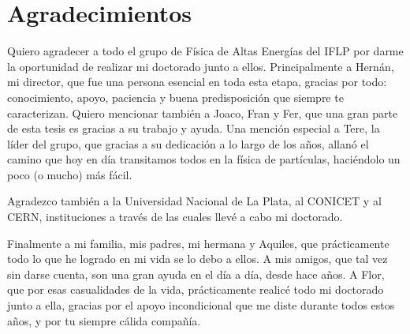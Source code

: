 \chapter*{Agradecimientos}

Quiero agradecer a todo el grupo de Física de Altas Energías del IFLP por darme la oportunidad de realizar mi doctorado junto a ellos. Principalmente a Hernán, mi director, que fue una persona esencial en toda esta etapa, gracias por todo: conocimiento, apoyo, paciencia y buena predisposición que siempre te caracterizan. Quiero mencionar también a Joaco, Fran y Fer, que una gran parte de esta tesis es gracias a su trabajo y ayuda. Una mención especial a Tere, la líder del grupo, que gracias a su dedicación a lo largo de los años, allanó el camino que hoy en día transitamos todos en la física de partículas, haciéndolo un poco (o mucho) más fácil. 

Agradezco también a la Universidad Nacional de La Plata, al CONICET y al CERN, instituciones a través de las cuales llevé a cabo mi doctorado.

Finalmente a mi familia, mis padres, mi hermana y Aquiles, que prácticamente todo lo que he logrado en mi vida se lo debo a ellos. A mis amigos, que tal vez sin darse cuenta, son una gran ayuda en el día a día, desde hace años. A Flor, que por esas casualidades de la vida, prácticamente realicé todo mi doctorado junto a ella, gracias por el apoyo incondicional que me diste durante todos estos años, y por tu siempre cálida compañía.